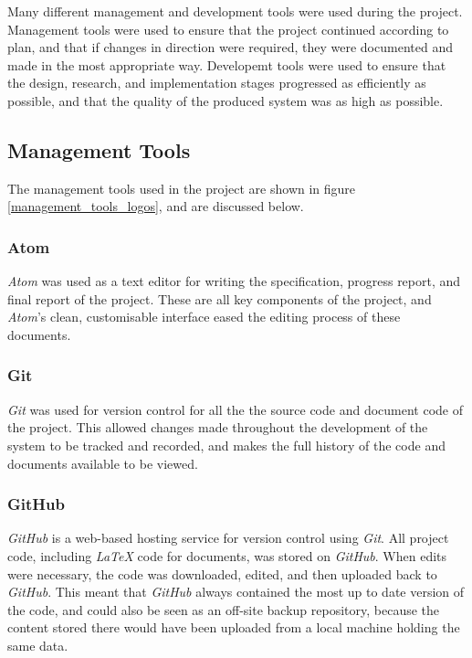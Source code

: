
Many different management and development tools were used during the project. Management tools were used to ensure that the project continued according to plan, and that if changes in direction were required, they were documented and made in the most appropriate way. Developemt tools were used to ensure that the design, research, and implementation stages progressed as efficiently as possible, and that the quality of the produced system was as high as possible.

\subsection{Management Tools}
\label{management_tools}
The management tools used in the project are shown in figure \ref{management_tools_logos}, and are discussed below.

\subsubsection{Atom \cite{atom}}
\textit{Atom} was used as a text editor for writing the specification, progress report, and final report of the project. These are all key components of the project, and \textit{Atom}'s clean, customisable interface eased the editing process of these documents.

\subsubsection{Git \cite{git}}
\textit{Git} was used for version control for all the the source code and document code of the project. This allowed changes made throughout the development of the system to be tracked and recorded, and makes the full history of the code and documents available to be viewed.

\subsubsection{GitHub \cite{github}}
\textit{GitHub} is a web-based hosting service for version control using \textit{Git}. All project code, including \textit{LaTeX} code for documents, was stored on \textit{GitHub}. When edits were necessary, the code was downloaded, edited, and then uploaded back to \textit{GitHub}. This meant that \textit{GitHub} always contained the most up to date version of the code, and could also be seen as an off-site backup repository, because the content stored there would have been uploaded from a local machine holding the same data.

